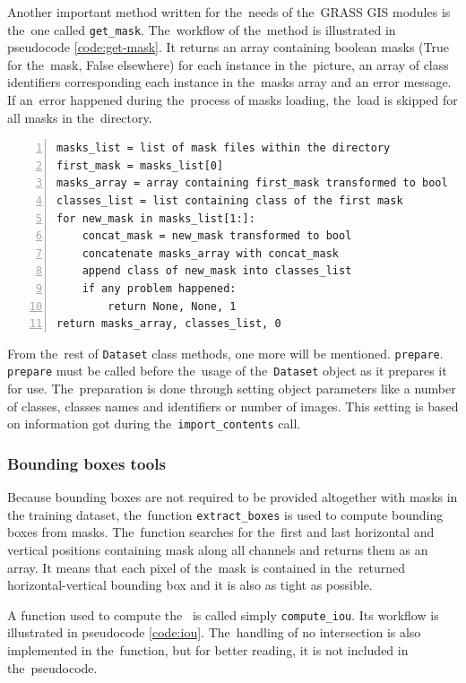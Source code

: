 Another important method written for the~needs of the~GRASS GIS modules is
the~one called \verb|get_mask|. The~workflow of the~method is illustrated in 
pseudocode \ref{code:get-mask}. It returns an array containing boolean masks 
(True for the~mask, False elsewhere) for each instance in the~picture, an array 
of class identifiers corresponding each instance in the~masks array and an error 
message. If an~error happened during the~process of masks loading, the~load is 
skipped for all masks in the~directory.

{\scriptsize
\begin{lstlisting}[style=python, caption={get\_mask}, captionpos=b, 
label=code:get-mask, deletekeywords={class},
backgroundcolor = \color{light-gray}, numbers=left, breaklines=true]
masks_list = list of mask files within the directory
first_mask = masks_list[0]
masks_array = array containing first_mask transformed to bool
classes_list = list containing class of the first mask
for new_mask in masks_list[1:]:
    concat_mask = new_mask transformed to bool
    concatenate masks_array with concat_mask
    append class of new_mask into classes_list
    if any problem happened:
        return None, None, 1
return masks_array, classes_list, 0
\end{lstlisting}}

From the~rest of \verb|Dataset| class methods, one more will be mentioned. 
\verb|prepare|. \verb|prepare| must be called before the~usage of
the~\verb|Dataset| object as it prepares it for use. The~preparation is done through 
setting object parameters like a number of classes, classes names and identifiers 
or number of images. This setting is based on information got during
the~\verb|import_contents| call.

\subsubsection{Bounding boxes tools}
\label{bbox-funcs}

Because bounding boxes are not required to be provided altogether with masks in 
the training dataset, the~function \verb|extract_boxes| is used to compute 
bounding boxes from masks. The~function searches for the~first and last 
horizontal and vertical positions containing mask along all channels and returns 
them as an array. It means that each pixel of the~mask is contained in
the~returned horizontal-vertical bounding box and it is also as tight as possible.

A function used to compute the~ is called simply \verb|compute_iou|. Its 
workflow is illustrated in pseudocode \ref{code:iou}. The~handling of no 
intersection is also implemented in the~function, but for better reading, it is 
not included in the~pseudocode.

